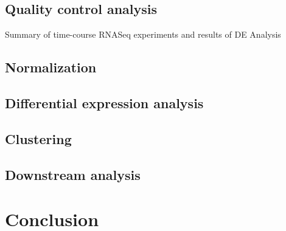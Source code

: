 \documentclass[11 pts]{article}
\begin{document}
\subsection{Quality control analysis}

\begin{table}
\caption{Summary of time-course RNASeq experiments and results of DE Analysis}
\end{table}


\subsection{Normalization}

\subsection{Differential expression analysis}

\subsection{Clustering}

\subsection{Downstream analysis}


\section{Conclusion}
\end{document}
